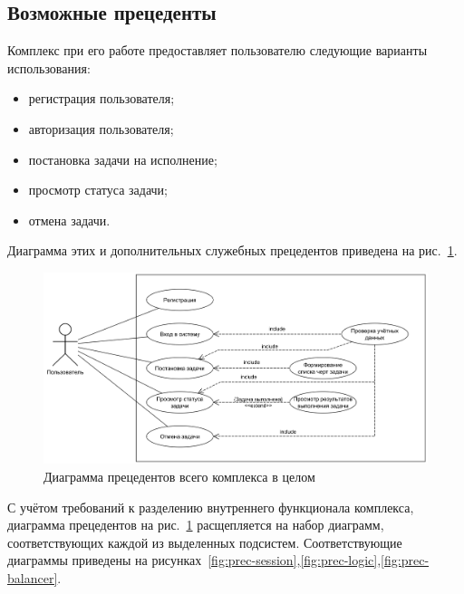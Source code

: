 \documentclass[a4paper,12pt]{report}
\numberwithin{equation}{section}
\begin{document}
  \subsection{Возможные прецеденты}
  Комплекс при его работе предоставляет пользователю следующие варианты использования:
  \begin{itemize}
    \item регистрация пользователя;
    \item авторизация пользователя;
    \item постановка задачи на исполнение;
    \item просмотр статуса задачи;
    \item отмена задачи.
  \end{itemize}
  
  Диаграмма этих и дополнительных служебных прецедентов приведена на рис.~\ref{fig:prec-common}.
  
  \begin{figure}[b]
    \centering
    \includegraphics[width=.9\linewidth]{diagrams/common/usecase}
    \caption{Диаграмма прецедентов всего комплекса в целом}
    \label{fig:prec-common}
  \end{figure}
  
  С учётом требований к разделению внутреннего функционала комплекса, диаграмма прецедентов на рис.~\ref{fig:prec-common}
  расщепляется на набор диаграмм, соответствующих каждой из выделенных подсистем.
  Соответствующие диаграммы приведены на рисунках~\ref{fig:prec-session},\ref{fig:prec-logic},\ref{fig:prec-balancer}.
  
\end{document}
